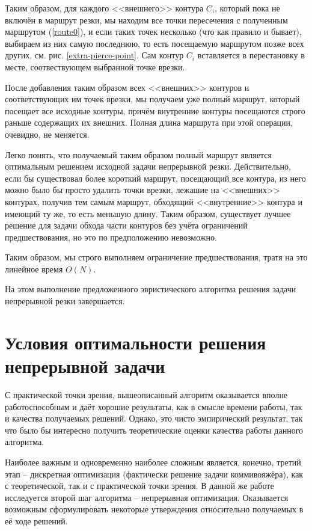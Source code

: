 \documentclass[14pt]{extarticle}
\theoremstyle{plain}%
\theoremstyle{remark}
\begin{document}
Таким образом,
для каждого
<<внешнего>> контура
$C_i$,
который пока не включён в маршрут резки,
мы находим все точки пересечения
с полученным маршрутом
(\ref{route0}),
и если таких точек несколько
(что как правило и бывает),
выбираем из них самую последнюю,
то есть посещаемую маршрутом позже всех
других,
см. рис. \ref{extra-pierce-point}.
Сам контур
$C_i$
вставляется в перестановку
в месте,
соотвествующем выбранной точке врезки.

После добавления таким образом всех
<<внешних>> контуров
и соответствующих им точек врезки,
мы получаем уже полный маршрут,
который посещает все исходные контуры,
причём внутренние контуры посещаются
строго раньше содержащих их внешних.
Полная длина маршрута
при этой операции,
очевидно,
не меняется.

Легко понять,
что получаемый таким образом полный маршрут
является оптимальным решением исходной задачи
непрерывной резки.
Действительно,
если бы существовал более короткий маршрут,
посещающий все контура,
из него можно было бы просто удалить
точки врезки,
лежашие на
<<внешних>> контурах,
получив тем самым маршрут,
обходящий <<внутренние>> контура
и имеющий ту же,
то есть меньшую длину.
Таким образом, существует лучшее
решение для задачи обхода
части контуров без учёта
ограничений предшествования,
но это по предположению невозможно.

Таким образом,
мы строго выполняем
ограничение предшествования,
тратя на это линейное время
$O(N)$.

На этом выполнение
предложенного эвристического алгоритма
решения задачи непрерывной резки
завершается.

\section{Условия оптимальности решения непрерывной задачи}

С практической точки зрения,
вышеописанный алгоритм оказывается
вполне работоспособным
и даёт хорошие результаты,
как в смысле времени работы,
так и качества получаемых решений.
Однако,
это чисто эмпирический результат,
так что было бы интересно получить
теоретические оценки качества работы
данного алгоритма.

Наиболее важным и одновременно
наиболее сложным является,
конечно, третий этап --
дискретная оптимизация
(фактически решение задачи коммивояжёра),
как с теоретической,
так и с практической точки зрения.
В данной же работе исследуется
второй шаг алгоритма --
непрерывная оптимизация.
Оказывается возможным сформулировать
некоторые утверждения относительно
получаемых в её ходе решений.
\end{document}

